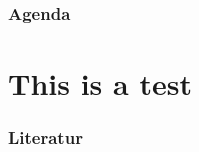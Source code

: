 \documentclass[aspectratio=169]{beamer}
\begin{document}


{
    \begin{frame}
        \titlepage
    \end{frame}
}

\begin{frame}
    \frametitle{Agenda}
    \tableofcontents
\end{frame}



\begin{frame}
    \cite{alvarez_ea_software_2020}
\end{frame}

\section{This is a test}
\frame{\sectionpage}

\begin{frame}
    \frametitle{Literatur}
    \vfill
    \printbibliography
    \vfill
\end{frame}
\end{document}
